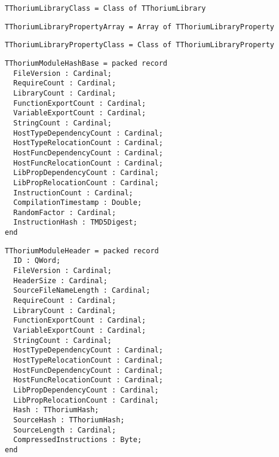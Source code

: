 \begin{verbatim}
TThoriumLibraryClass = Class of TThoriumLibrary
\end{verbatim}
\label{thoriumcore:thorium:tthoriumlibraryclass}



\begin{verbatim}
TThoriumLibraryPropertyArray = Array of TThoriumLibraryProperty
\end{verbatim}
\label{thoriumcore:thorium:tthoriumlibrarypropertyarray}



\begin{verbatim}
TThoriumLibraryPropertyClass = Class of TThoriumLibraryProperty
\end{verbatim}
\label{thoriumcore:thorium:tthoriumlibrarypropertyclass}



\begin{verbatim}
TThoriumModuleHashBase = packed record
  FileVersion : Cardinal;
  RequireCount : Cardinal;
  LibraryCount : Cardinal;
  FunctionExportCount : Cardinal;
  VariableExportCount : Cardinal;
  StringCount : Cardinal;
  HostTypeDependencyCount : Cardinal;
  HostTypeRelocationCount : Cardinal;
  HostFuncDependencyCount : Cardinal;
  HostFuncRelocationCount : Cardinal;
  LibPropDependencyCount : Cardinal;
  LibPropRelocationCount : Cardinal;
  InstructionCount : Cardinal;
  CompilationTimestamp : Double;
  RandomFactor : Cardinal;
  InstructionHash : TMD5Digest;
end

\end{verbatim}
\label{thoriumcore:thorium:tthoriummodulehashbase}



\begin{verbatim}
TThoriumModuleHeader = packed record
  ID : QWord;
  FileVersion : Cardinal;
  HeaderSize : Cardinal;
  SourceFileNameLength : Cardinal;
  RequireCount : Cardinal;
  LibraryCount : Cardinal;
  FunctionExportCount : Cardinal;
  VariableExportCount : Cardinal;
  StringCount : Cardinal;
  HostTypeDependencyCount : Cardinal;
  HostTypeRelocationCount : Cardinal;
  HostFuncDependencyCount : Cardinal;
  HostFuncRelocationCount : Cardinal;
  LibPropDependencyCount : Cardinal;
  LibPropRelocationCount : Cardinal;
  Hash : TThoriumHash;
  SourceHash : TThoriumHash;
  SourceLength : Cardinal;
  CompressedInstructions : Byte;
end

\end{verbatim}
\label{thoriumcore:thorium:tthoriummoduleheader}



